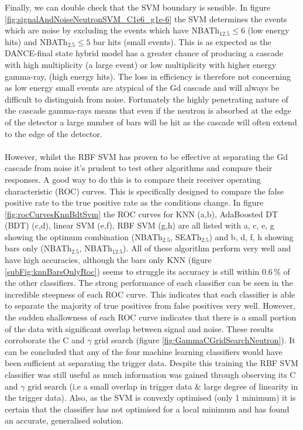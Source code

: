 Finally, we can double check that the SVM boundary is sensible. In figure \ref{fig:signalAndNoiseNeutronSVM_C1e6_g1e-6} the SVM determines the events which are noise by excluding the events which have NBATh$_{12.5}\leq 6$ (low energy hits) and NBATh$_{2.5} \leq 5$ bar hits (small events). This is as expected as the DANCE-final state hybrid model has a greater chance of producing a cascade with high multiplicity (a large event) or low multiplicity with higher energy gamma-ray, (high energy hits). The loss in efficiency is therefore not concerning as low energy small events are atypical of the Gd cascade and will always be difficult to distinguish from noise. Fortunately the highly penetrating nature of the cascade gamma-rays means that even if the neutron is absorbed at the edge of the detector a large number of bars will be hit as the cascade will often extend to the edge of the detector. 
\\\\However, whilst the RBF SVM has proven to be effective at separating the Gd cascade from noise it's prudent to test other algorithms and compare their responses. A good way to do this is to compare their receiver operating characteristic (ROC) curves. This is specifically designed to compare the false positive rate to the true positive rate as the conditions change. In figure \ref{fig:rocCurvesKnnBdtSvm} the ROC curves for KNN (a,b), AdaBoosted DT (BDT) (c,d), linear SVM (e,f), RBF SVM (g,h) are all listed with a, c, e, g showing the optimum combination (NBATh$_{2.5}$, SEATh$_{2.5}$) and b, d, f, h showing bars only (NBATh$_{2.5}$, NBATh$_{12.5}$). All of these algorithm perform very well and have high accuracies, although the bars only KNN (figure \ref{subFig:knnBarsOnlyRoc}) seems to struggle its accuracy is still within 0.6\,\% of the other classifiers. The strong performance of each classifier can be seen in the incredible steepness of each ROC curve. This indicates that each classifier is able to separate the majority of true positives from false positives very well. However, the sudden shallowness of each ROC curve indicates that there is a small portion of the data with significant overlap between signal and noise. These results corroborate the C and $\gamma$ grid search (figure \ref{fig:GammaCGridSearchNeutron}). It can be concluded that any of the four machine learning classifiers would have been sufficient at separating the trigger data. Despite this training the RBF SVM classifier was still useful as much information was gained through observing its C and $\gamma$ grid search (i.e a small overlap in trigger data \& large degree of linearity in the trigger data). Also, as the SVM is convexly optimised (only 1 minimum) it is certain that the classifier has not optimised for a local minimum and has found an accurate, generalised solution. 
